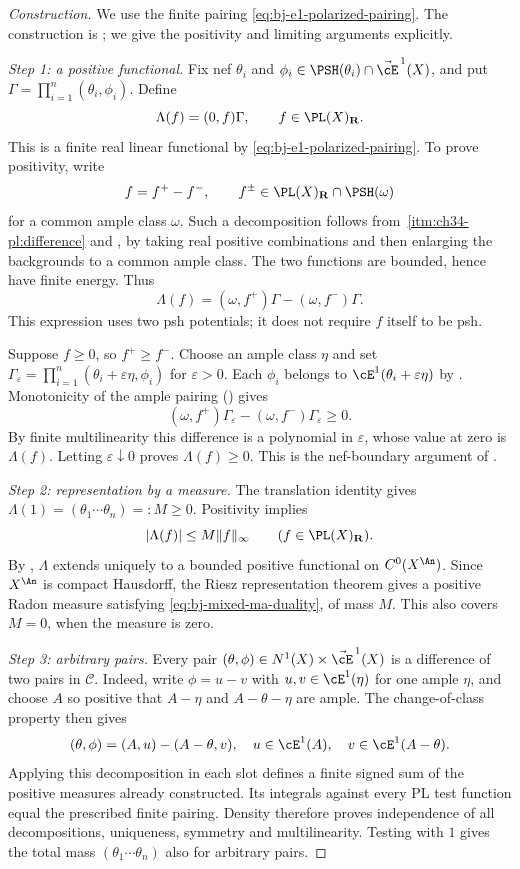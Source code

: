 \begin{proof}[Construction]
We use the finite pairing \eqref{eq:bj-e1-polarized-pairing}.  The
construction is \cite[Theorem~7.18 and Proposition~7.19]{BJ22};
we give the positivity and limiting arguments explicitly.

\emph{Step 1: a positive functional.}
Fix nef $\theta_i$ and
$\phi_i\in\PSH(\theta_i)\cap\vec{\cE}^{\,1}(X)$, and put
$\Gamma=\prod_{i=1}^n(\theta_i,\phi_i)$.  Define
\[
 \Lambda(f)=(0,f)\Gamma,\qquad f\in\PL(X)_{\mathbf R}.
\]
This is a finite real linear functional by
\eqref{eq:bj-e1-polarized-pairing}.  To prove positivity, write
\[
 f=f^+-f^-,
 \qquad f^\pm\in\PL(X)_{\mathbf R}\cap\PSH(\omega)
\]
for a common ample class $\omega$.  Such a decomposition follows from
\,\cref{itm:ch34-pl:difference} and
, by taking real positive combinations and
then enlarging the backgrounds to a common ample class.  The two
functions are bounded, hence have finite energy.  Thus
\[
 \Lambda(f)=(\omega,f^+)\Gamma-(\omega,f^-)\Gamma.
\]
This expression uses two psh potentials; it does not require $f$ itself
to be psh.

Suppose $f\geq0$, so $f^+\geq f^-$.  Choose an ample class $\eta$ and
set $\Gamma_\varepsilon=\prod_{i=1}^n
(\theta_i+\varepsilon\eta,\phi_i)$ for $\varepsilon>0$.
Each $\phi_i$ belongs to $\cE^1(\theta_i+\varepsilon\eta)$ by
\cite[Lemma~7.13]{BJ22}.  Monotonicity of the ample pairing
() gives
\[
 (\omega,f^+)\Gamma_\varepsilon
       -(\omega,f^-)\Gamma_\varepsilon\geq0.
\]
By finite multilinearity this difference is a polynomial in
$\varepsilon$, whose value at zero is $\Lambda(f)$.  Letting
$\varepsilon\downarrow0$ proves $\Lambda(f)\geq0$.
This is the nef-boundary argument of \cite[Lemma~7.15]{BJ22}.

\emph{Step 2: representation by a measure.}
The translation identity gives
$\Lambda(1)=(\theta_1\cdots\theta_n)=:M\geq0$.  Positivity implies
\[
 |\Lambda(f)|\leq M\lVert f\rVert_\infty
 \qquad(f\in\PL(X)_{\mathbf R}).
\]
By , $\Lambda$ extends uniquely to a bounded
positive functional on $C^0(X^{\An})$.  Since $X^{\An}$ is compact
Hausdorff, the Riesz representation theorem gives a positive Radon
measure satisfying \eqref{eq:bj-mixed-ma-duality}, of mass $M$.
This also covers $M=0$, when the measure is zero.

\emph{Step 3: arbitrary pairs.}
Every pair $(\theta,\phi)\in N^1(X)\times\vec{\cE}^{\,1}(X)$
is a difference of two pairs in $\mathcal C$.
Indeed, write $\phi=u-v$ with $u,v\in\cE^1(\eta)$ for one ample
$\eta$, and choose $A$ so positive that $A-\eta$ and $A-\theta-\eta$
are ample.  The change-of-class property then gives
\[
 (\theta,\phi)=(A,u)-(A-\theta,v),
 \quad
 u\in\cE^1(A),\quad v\in\cE^1(A-\theta).
\]
Applying this decomposition in each slot defines a finite signed sum
of the positive measures already constructed.  Its integrals against
every PL test function equal the prescribed finite pairing.  Density
therefore proves independence of all decompositions, uniqueness,
symmetry and multilinearity.  Testing with $1$ gives the total mass
$(\theta_1\cdots\theta_n)$ also for arbitrary pairs.


\end{proof}

